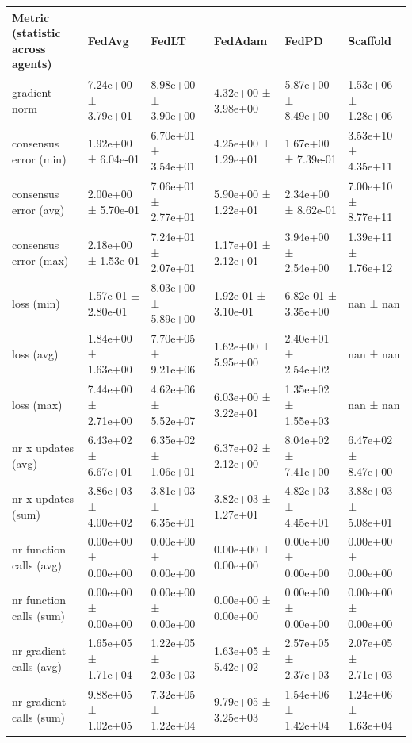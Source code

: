 \begin{tabular}{llllll}
\hline
 Metric (statistic across agents)   & FedAvg              & FedLT               & FedAdam             & FedPD               & Scaffold            \\
\hline
 gradient norm                      & 7.24e+00 ± 3.79e+01 & 8.98e+00 ± 3.90e+00 & 4.32e+00 ± 3.98e+00 & 5.87e+00 ± 8.49e+00 & 1.53e+06 ± 1.28e+06 \\
 consensus error (min)              & 1.92e+00 ± 6.04e-01 & 6.70e+01 ± 3.54e+01 & 4.25e+00 ± 1.29e+01 & 1.67e+00 ± 7.39e-01 & 3.53e+10 ± 4.35e+11 \\
 consensus error (avg)              & 2.00e+00 ± 5.70e-01 & 7.06e+01 ± 2.77e+01 & 5.90e+00 ± 1.22e+01 & 2.34e+00 ± 8.62e-01 & 7.00e+10 ± 8.77e+11 \\
 consensus error (max)              & 2.18e+00 ± 1.53e-01 & 7.24e+01 ± 2.07e+01 & 1.17e+01 ± 2.12e+01 & 3.94e+00 ± 2.54e+00 & 1.39e+11 ± 1.76e+12 \\
 loss (min)                         & 1.57e-01 ± 2.80e-01 & 8.03e+00 ± 5.89e+00 & 1.92e-01 ± 3.10e-01 & 6.82e-01 ± 3.35e+00 & nan ± nan           \\
 loss (avg)                         & 1.84e+00 ± 1.63e+00 & 7.70e+05 ± 9.21e+06 & 1.62e+00 ± 5.95e+00 & 2.40e+01 ± 2.54e+02 & nan ± nan           \\
 loss (max)                         & 7.44e+00 ± 2.71e+00 & 4.62e+06 ± 5.52e+07 & 6.03e+00 ± 3.22e+01 & 1.35e+02 ± 1.55e+03 & nan ± nan           \\
 nr x updates (avg)                 & 6.43e+02 ± 6.67e+01 & 6.35e+02 ± 1.06e+01 & 6.37e+02 ± 2.12e+00 & 8.04e+02 ± 7.41e+00 & 6.47e+02 ± 8.47e+00 \\
 nr x updates (sum)                 & 3.86e+03 ± 4.00e+02 & 3.81e+03 ± 6.35e+01 & 3.82e+03 ± 1.27e+01 & 4.82e+03 ± 4.45e+01 & 3.88e+03 ± 5.08e+01 \\
 nr function calls (avg)            & 0.00e+00 ± 0.00e+00 & 0.00e+00 ± 0.00e+00 & 0.00e+00 ± 0.00e+00 & 0.00e+00 ± 0.00e+00 & 0.00e+00 ± 0.00e+00 \\
 nr function calls (sum)            & 0.00e+00 ± 0.00e+00 & 0.00e+00 ± 0.00e+00 & 0.00e+00 ± 0.00e+00 & 0.00e+00 ± 0.00e+00 & 0.00e+00 ± 0.00e+00 \\
 nr gradient calls (avg)            & 1.65e+05 ± 1.71e+04 & 1.22e+05 ± 2.03e+03 & 1.63e+05 ± 5.42e+02 & 2.57e+05 ± 2.37e+03 & 2.07e+05 ± 2.71e+03 \\
 nr gradient calls (sum)            & 9.88e+05 ± 1.02e+05 & 7.32e+05 ± 1.22e+04 & 9.79e+05 ± 3.25e+03 & 1.54e+06 ± 1.42e+04 & 1.24e+06 ± 1.63e+04 \\

\end{tabular}
